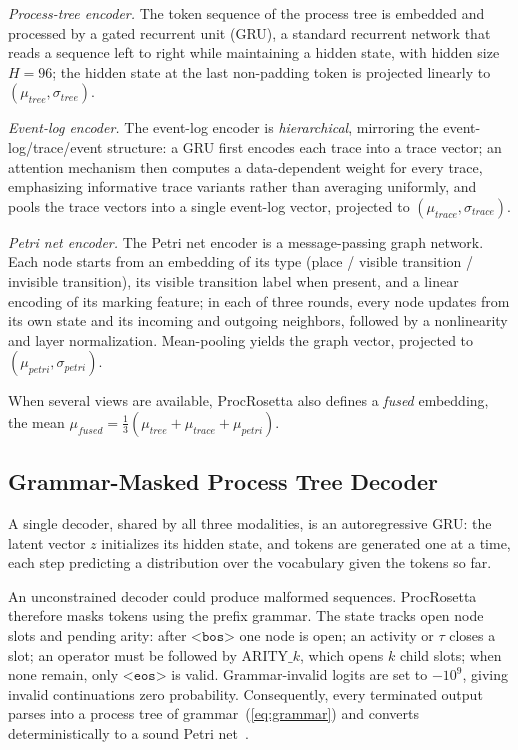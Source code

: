 \documentclass[manuscript,screen,nonacm]{acmart}
\begin{document}
\emph{Process-tree encoder.} The token sequence of the process tree is embedded and processed by a gated recurrent unit (GRU), a standard recurrent network that reads a sequence left to right while maintaining a hidden state, with hidden size $H = 96$; the hidden state at the last non-padding token is projected linearly to $(\mu_{\mathit{tree}}, \sigma_{\mathit{tree}})$.

\emph{Event-log encoder.} The event-log encoder is \emph{hierarchical}, mirroring the event-log/trace/event structure: a GRU first encodes each trace into a trace vector; an attention mechanism then computes a data-dependent weight for every trace, emphasizing informative trace variants rather than averaging uniformly, and pools the trace vectors into a single event-log vector, projected to $(\mu_{\mathit{trace}}, \sigma_{\mathit{trace}})$.

\emph{Petri net encoder.} The Petri net encoder is a message-passing graph network. Each node starts from an embedding of its type (place / visible transition / invisible transition), its visible transition label when present, and a linear encoding of its marking feature; in each of three rounds, every node updates from its own state and its incoming and outgoing neighbors, followed by a nonlinearity and layer normalization. Mean-pooling yields the graph vector, projected to $(\mu_{\mathit{petri}}, \sigma_{\mathit{petri}})$.

When several views are available, ProcRosetta also defines a \emph{fused} embedding, the mean $\mu_{\mathit{fused}} = \tfrac{1}{3}(\mu_{\mathit{tree}} + \mu_{\mathit{trace}} + \mu_{\mathit{petri}})$.

\subsection{Grammar-Masked Process Tree Decoder}
\label{sec:decoder}

A single decoder, shared by all three modalities, is an autoregressive GRU: the latent vector $z$ initializes its hidden state, and tokens are generated one at a time, each step predicting a distribution over the vocabulary given the tokens so far.

An unconstrained decoder could produce malformed sequences. ProcRosetta therefore masks tokens using the prefix grammar. The state tracks open node slots and pending arity: after $\texttt{<bos>}$ one node is open; an activity or $\tau$ closes a slot; an operator must be followed by $\mathrm{ARITY}\_k$, which opens $k$ child slots; when none remain, only $\texttt{<eos>}$ is valid. Grammar-invalid logits are set to $-10^9$, giving invalid continuations zero probability. Consequently, every terminated output parses into a process tree of grammar~(\ref{eq:grammar}) and converts deterministically to a sound Petri net~\cite{Geng2023}.
\end{document}
